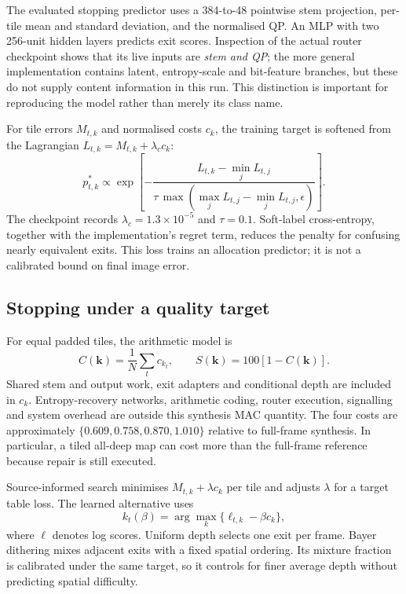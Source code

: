 The evaluated stopping predictor uses a 384-to-48 pointwise stem projection,
per-tile mean and standard deviation, and the normalised QP. An MLP with two
256-unit hidden layers predicts exit scores. Inspection of the actual router checkpoint
shows that its live inputs are \emph{stem and QP}; the more general
implementation contains latent, entropy-scale and bit-feature branches, but
these do not supply content information in this run. This distinction is
important for reproducing the model rather than merely its class name.

For tile errors $M_{t,k}$ and normalised costs $c_k$, the training target is
softened from the Lagrangian $L_{t,k}=M_{t,k}+\lambda_c c_k$:
\begin{equation}
 p^*_{t,k}\propto\exp\!\left[-\frac{L_{t,k}-\min_j L_{t,j}}
 {\tau\,\max(\max_j L_{t,j}-\min_j L_{t,j},\epsilon)}\right].
 \label{eq:softtarget}
\end{equation}
The checkpoint records $\lambda_c=1.3\times10^{-5}$ and $\tau=0.1$.
Soft-label cross-entropy, together with the implementation's regret term,
reduces the penalty for confusing nearly equivalent exits. This loss trains
an allocation predictor; it is not a calibrated bound on final image error.

\subsection{Stopping under a quality target}

For equal padded tiles, the arithmetic model is
\begin{equation}
 C(\mathbf k)=\frac1N\sum_t c_{k_t},\qquad
 S(\mathbf k)=100[1-C(\mathbf k)].
 \label{eq:cost}
\end{equation}
Shared stem and output work, exit adapters and conditional depth are included
in $c_k$. Entropy-recovery networks, arithmetic coding, router execution,
signalling and system overhead are outside this synthesis MAC quantity.
The four costs are approximately
$\{0.609,0.758,0.870,1.010\}$ relative to full-frame synthesis. In particular,
a tiled all-deep map can cost more than the full-frame reference because repair
is still executed.

Source-informed search minimises $M_{t,k}+\lambda c_k$ per tile and adjusts
$\lambda$ for a target table loss. The learned alternative uses
\begin{equation}
 k_t(\beta)=\arg\max_k\{\ell_{t,k}-\beta c_k\},
 \label{eq:router}
\end{equation}
where $\ell$ denotes log scores. Uniform depth selects one exit per frame.
Bayer dithering mixes adjacent exits with a fixed spatial ordering. Its
mixture fraction is calibrated under the same target, so it controls for
finer average depth without predicting spatial difficulty.

